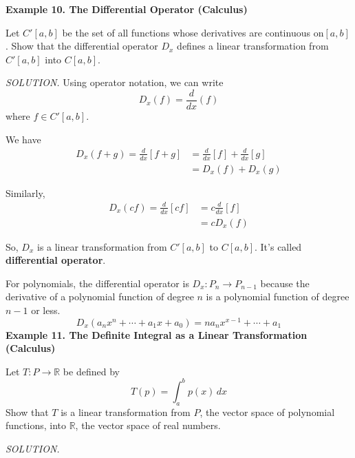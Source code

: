 \documentclass{article}
\newcommand\R{\mathbb{R}}
\newcommand\ddfrac[2]{\frac{\displaystyle #1}{\displaystyle #2}}
\newcounter{Def}[section]
\begin{document}
    \textbf{Example 10. \textcolor{blue5}{The Differential Operator (Calculus)}}

    Let $C'[a,b]$ be the set of all functions whose derivatives are continuous on$[a,b]$. Show that the differential
    operator $D_x$ defines a linear transformation from $C'[a,b]$ into $C[a,b]$.

    \textit{\textcolor{blue9}{SOLUTION.}} Using operator notation, we can write
    \[D_x(f) = \ddfrac{d}{dx} (f) \]
    where $f \in C'[a,b]$. 
    
    \begin{minipage}{0.49\linewidth}
    We have 
    \begin{equation*}
        \begin{split}
            D_x(f + g) = \ddfrac{d}{dx}[f + g] &= \ddfrac{d}{dx}[f] + \ddfrac{d}{dx}[g]\\
                                               &= D_x(f) + D_x(g)
        \end{split}
    \end{equation*}
    \end{minipage} \hfill \vline \hfill
    \begin{minipage}{0.45\linewidth}
    Similarly,
    \begin{equation*}
        \begin{split}
        D_x(cf) = \ddfrac{d}{dx}[cf] &= c \ddfrac{d}{dx}[f] \\
        &= cD_x(f)
        \end{split}
    \end{equation*}    
    \end{minipage}
    
    So, $D_x$ is a linear transformation from $C'[a,b]$ to $C[a,b]$. It's called \textbf{differential operator}.

    For polynomials, the differential operator is $D_x: P_n \to P_{n-1}$ because the derivative of a polynomial function
    of degree $n$ is a polynomial function of degree $n-1$ or less.
    \[D_x( a_nx^n + \cdots + a_1x + a_0 ) = na_nx^{x-1} + \cdots + a_1 \]
    \textbf{Example 11. \textcolor{blue5}{The Definite Integral as a Linear Transformation (Calculus)}}
    
    Let $T: P \to \R$ be defined by
    \[T(p) =  \int_a^b p(x)\,dx\]
    Show that $T$ is a linear transformation from $P$, the vector space of polynomial functions, into $ \R $, the vector space
    of real numbers.

    \textit{\textcolor{blue5}{SOLUTION.}}
    
\end{document}
